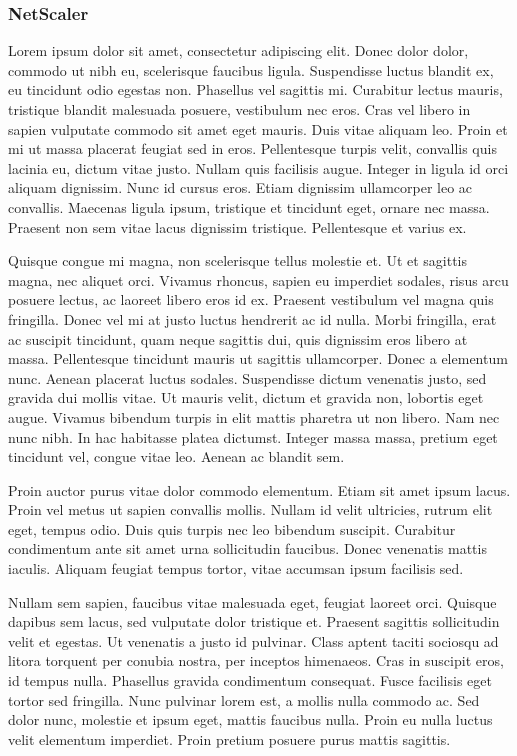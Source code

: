 \documentclass[a4paper,12pt]{report}
\begin{document}
\subsubsection{NetScaler} %
Lorem ipsum dolor sit amet, consectetur adipiscing elit. Donec dolor dolor, commodo ut nibh eu, scelerisque faucibus ligula. Suspendisse luctus blandit ex, eu tincidunt odio egestas non. Phasellus vel sagittis mi. Curabitur lectus mauris, tristique blandit malesuada posuere, vestibulum nec eros. Cras vel libero in sapien vulputate commodo sit amet eget mauris. Duis vitae aliquam leo. Proin et mi ut massa placerat feugiat sed in eros. Pellentesque turpis velit, convallis quis lacinia eu, dictum vitae justo. Nullam quis facilisis augue. Integer in ligula id orci aliquam dignissim. Nunc id cursus eros. Etiam dignissim ullamcorper leo ac convallis. Maecenas ligula ipsum, tristique et tincidunt eget, ornare nec massa. Praesent non sem vitae lacus dignissim tristique. Pellentesque et varius ex.

Quisque congue mi magna, non scelerisque tellus molestie et. Ut et sagittis magna, nec aliquet orci. Vivamus rhoncus, sapien eu imperdiet sodales, risus arcu posuere lectus, ac laoreet libero eros id ex. Praesent vestibulum vel magna quis fringilla. Donec vel mi at justo luctus hendrerit ac id nulla. Morbi fringilla, erat ac suscipit tincidunt, quam neque sagittis dui, quis dignissim eros libero at massa. Pellentesque tincidunt mauris ut sagittis ullamcorper. Donec a elementum nunc. Aenean placerat luctus sodales. Suspendisse dictum venenatis justo, sed gravida dui mollis vitae. Ut mauris velit, dictum et gravida non, lobortis eget augue. Vivamus bibendum turpis in elit mattis pharetra ut non libero. Nam nec nunc nibh. In hac habitasse platea dictumst. Integer massa massa, pretium eget tincidunt vel, congue vitae leo. Aenean ac blandit sem.

Proin auctor purus vitae dolor commodo elementum. Etiam sit amet ipsum lacus. Proin vel metus ut sapien convallis mollis. Nullam id velit ultricies, rutrum elit eget, tempus odio. Duis quis turpis nec leo bibendum suscipit. Curabitur condimentum ante sit amet urna sollicitudin faucibus. Donec venenatis mattis iaculis. Aliquam feugiat tempus tortor, vitae accumsan ipsum facilisis sed.

Nullam sem sapien, faucibus vitae malesuada eget, feugiat laoreet orci. Quisque dapibus sem lacus, sed vulputate dolor tristique et. Praesent sagittis sollicitudin velit et egestas. Ut venenatis a justo id pulvinar. Class aptent taciti sociosqu ad litora torquent per conubia nostra, per inceptos himenaeos. Cras in suscipit eros, id tempus nulla. Phasellus gravida condimentum consequat. Fusce facilisis eget tortor sed fringilla. Nunc pulvinar lorem est, a mollis nulla commodo ac. Sed dolor nunc, molestie et ipsum eget, mattis faucibus nulla. Proin eu nulla luctus velit elementum imperdiet. Proin pretium posuere purus mattis sagittis.
\end{document}
